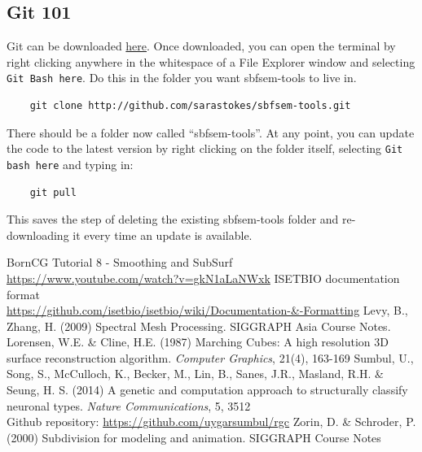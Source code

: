 \documentclass[12pt]{exam}
\begin{document}
	\subsection{Git 101}
	Git can be downloaded \href{https://git-scm.com/}{here}. Once downloaded, you can open the terminal by right clicking anywhere in the whitespace of a File Explorer window and selecting \texttt{Git Bash here}. Do this in the folder you want sbfsem-tools to live in. 
	\begin{lstlisting}
	git clone http://github.com/sarastokes/sbfsem-tools.git\end{lstlisting}
	There should be a folder now called ``sbfsem-tools''. At any point, you can update the code to the latest version by right clicking on the folder itself, selecting \texttt{Git bash here} and typing in:
	\begin{lstlisting}
	git pull\end{lstlisting}
	This saves the step of deleting the existing sbfsem-tools folder and re-downloading it every time an update is available.
	\begin{thebibliography}{[20]}
			BornCG Tutorial 8 - Smoothing and SubSurf\\
			\url{https://www.youtube.com/watch?v=gkN1aLaNWxk}
			ISETBIO documentation format\\
			\url{https://github.com/isetbio/isetbio/wiki/Documentation-&-Formatting}
			Levy, B., Zhang, H. (2009) Spectral Mesh Processing. SIGGRAPH Asia Course Notes.
			Lorensen, W.E. \& Cline, H.E. (1987) Marching Cubes: A high resolution 3D surface reconstruction algorithm. \textit{Computer Graphics}, 21(4), 163-169
			Sumbul, U., Song, S., McCulloch, K., Becker, M., Lin, B., Sanes, J.R., Masland, R.H. \& Seung, H. S. (2014) A genetic and computation approach to structurally classify neuronal types. \textit{Nature Communications}, 5, 3512\\
			Github repository: \url{https://github.com/uygarsumbul/rgc}
			Zorin, D. \& Schroder, P. (2000) Subdivision for modeling and animation. SIGGRAPH Course Notes
	\end{thebibliography}
\end{document}
